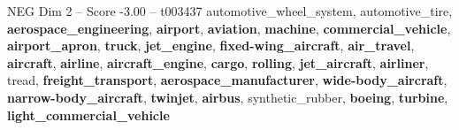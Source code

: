 \begin{textsample}{NEG Dim 2 – Score -3.00 – t003437}  \label{ex:f2_neg_022}
automotive\_wheel\_system, automotive\_tire, \textbf{aerospace\_engineering}, \textbf{airport}, \textbf{aviation}, \textbf{machine}, \textbf{commercial\_vehicle}, \textbf{airport\_apron}, \textbf{truck}, \textbf{jet\_engine}, \textbf{fixed-wing\_aircraft}, \textbf{air\_travel}, \textbf{aircraft}, \textbf{airline}, \textbf{aircraft\_engine}, \textbf{cargo}, \textbf{rolling}, \textbf{jet\_aircraft}, \textbf{airliner}, tread, \textbf{freight\_transport}, \textbf{aerospace\_manufacturer}, \textbf{wide-body\_aircraft}, \textbf{narrow-body\_aircraft}, \textbf{twinjet}, \textbf{airbus}, synthetic\_rubber, \textbf{boeing}, \textbf{turbine}, \textbf{light\_commercial\_vehicle}

\end{textsample}
